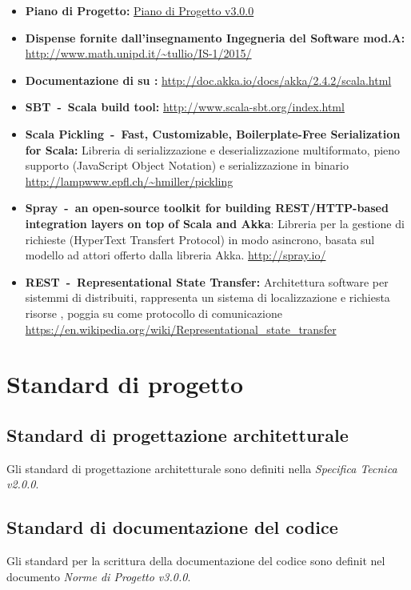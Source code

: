 \documentclass{scalatekids-article}
\begin{document}
\begin{itemize}
\item\textbf{Piano di Progetto:} \href{run:./PianoDiProgetto\_v3.0.0.pdf}{Piano di Progetto v3.0.0}
\item\textbf{Dispense fornite dall'insegnamento Ingegneria del Software mod.A:}\\
  \url{http://www.math.unipd.it/~tullio/IS-1/2015/}
\item\textbf{Documentazione di  su :}
  \url{http://doc.akka.io/docs/akka/2.4.2/scala.html}
\item\textbf{SBT\ -\ Scala build tool:}
  \url{http://www.scala-sbt.org/index.html}
\item\textbf{Scala Pickling\ -\ Fast, Customizable, Boilerplate-Free Serialization for Scala:} Libreria di serializzazione e deserializzazione
  multiformato, pieno supporto  (JavaScript Object Notation) e
  serializzazione in binario \url{http://lampwww.epfl.ch/~hmiller/pickling}
\item\textbf{Spray\ -\ an open-source toolkit for building REST/HTTP-based integration layers on top of Scala and Akka}:
  Libreria per la gestione di richieste (HyperText Transfert Protocol) in modo asincrono, basata sul modello ad
  attori offerto dalla libreria Akka. \url{http://spray.io/}
\item\textbf{REST\ -\ Representational State Transfer:} Architettura software
  per sistemmi di  distribuiti, rappresenta un sistema di
  localizzazione e richiesta risorse , poggia su 
  come protocollo di comunicazione \url{https://en.wikipedia.org/wiki/Representational_state_transfer}
\end{itemize}

\newpage

\section{Standard di progetto}
\subsection{Standard di progettazione architetturale}
Gli standard di progettazione architetturale sono definiti nella
\textit{Specifica Tecnica v2.0.0}.

\subsection{Standard di documentazione del codice}
Gli standard per la scrittura della documentazione del codice sono definit nel
documento \textit{Norme di Progetto v3.0.0}.
\end{document}
